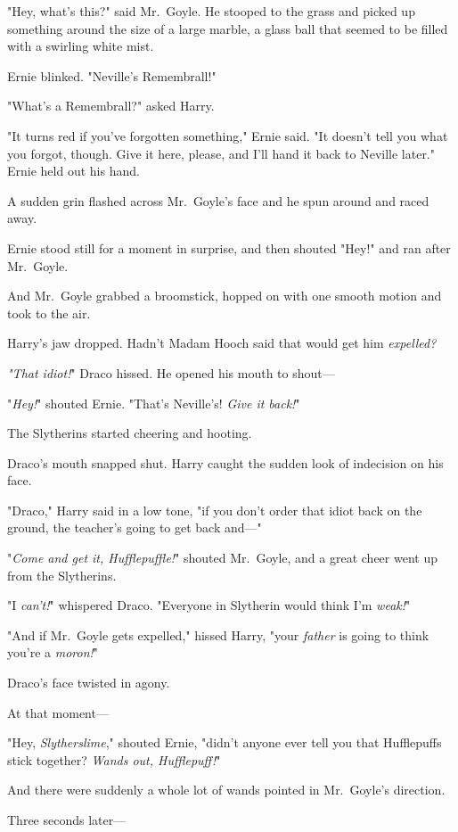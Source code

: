 "Hey, what's this?" said Mr.~Goyle. He stooped to the grass and picked up 
something around the size of a large marble, a glass ball that seemed to be 
filled with a swirling white mist.

Ernie blinked. "Neville's Remembrall!"

"What's a Remembrall?" asked Harry.

"It turns red if you've forgotten something," Ernie said. "It doesn't tell you 
what you forgot, though. Give it here, please, and I'll hand it back to Neville 
later." Ernie held out his hand.

A sudden grin flashed across Mr.~Goyle's face and he spun around and raced away.

Ernie stood still for a moment in surprise, and then shouted "Hey!" and ran 
after Mr.~Goyle.

And Mr.~Goyle grabbed a broomstick, hopped on with one smooth motion and took 
to the air.

Harry's jaw dropped. Hadn't Madam Hooch said that would get him \emph{expelled?}

\emph{"That idiot!}" Draco hissed. He opened his mouth to shout---

"\emph{Hey!}" shouted Ernie. "That's Neville's! \emph{Give it back!}"

The Slytherins started cheering and hooting.

Draco's mouth snapped shut. Harry caught the sudden look of indecision on his 
face.

"Draco," Harry said in a low tone, "if you don't order that idiot back on the 
ground, the teacher's going to get back and---"

"\emph{Come and get it, Hufflepuffle!}" shouted Mr.~Goyle, and a great cheer 
went up from the Slytherins.

"I \emph{can't!}" whispered Draco. "Everyone in Slytherin would think I'm 
\emph{weak!}"

"And if Mr.~Goyle gets expelled," hissed Harry, "your \emph{father} is going to 
think you're a \emph{moron!}"

Draco's face twisted in agony.

At that moment---

"Hey, \emph{Slytherslime}," shouted Ernie, "didn't anyone ever tell you that 
Hufflepuffs stick together? \emph{Wands out, Hufflepuff!}"

And there were suddenly a whole lot of wands pointed in Mr.~Goyle's direction.

Three seconds later---

